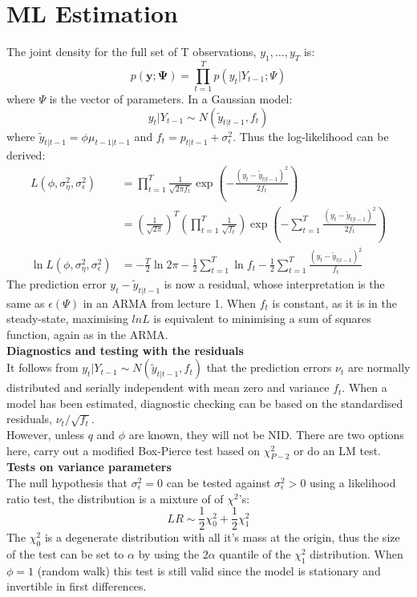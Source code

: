 \documentclass[DIV=14,titlepage=false]{scrreprt}
\begin{document}
\section{ML Estimation}
The joint density for the full set of T observations, $y_1, \dots, y_T$ is:
\[
    p(\mathbf{y;\Psi}) = \prod_{t=1}^T p(y_t|Y_{t-1};\Psi)
\]
where $\Psi$ is the vector of parameters. In a Gaussian model:
\[
    y_t|Y_{t-1} \sim N(\tilde y_{t|t-1}, f_t)
\] where $\tilde y_{t|t-1} = \phi \mu_{t-1|t-1}$ and $f_t = p_{t|t-1} + \sigma^2_\epsilon$. Thus the log-likelihood can be derived:
\begin{align*}
    L(\phi, \sigma^2_\eta, \sigma^2_\epsilon) &= \prod_{t=1}^T \frac{1}{\sqrt{2\pi f_t}} \exp \left( -\frac{(y_t - \tilde y_{t|t-1})^2}{2f_t} \right)\\
    &= \left( \frac{1}{\sqrt{2\pi}} \right)^T \left(\prod_{t=1}^T \frac{1}{\sqrt{f_t}}\right) \exp \left( -\sum_{t=1}^T\frac{(y_t - \tilde y_{t|t-1})^2}{2f_t} \right)\\
    \ln L (\phi, \sigma^2_\eta, \sigma^2_\epsilon) &= -\frac{T}{2} \ln 2\pi - \frac{1}{2} \sum_{t=1}^T \ln f_t - \frac{1}{2} \sum_{t=1}^T \frac{(y_t - \tilde y_{t|t-1})^2}{f_t} 
\end{align*}
The prediction error $y_t - \tilde y_{t|t-1}$ is now a residual, whose interpretation is the same as $\epsilon (\Psi)$ in an ARMA from lecture 1. When $f_t$ is constant, as it is in the steady-state, maximising $ln L$ is equivalent to minimising a sum of squares function, again as in the ARMA.\\
\textbf{Diagnostics and testing with the residuals}\\
It follows from $y_t|Y_{t-1} \sim N(\tilde y_{t|t-1}, f_t)$ that the prediction errors $\nu_t$ are normally distributed and serially independent with mean zero and variance $f_t$. When a model has been estimated, diagnostic checking can be based on the standardised residuals, $\nu_t / \sqrt{f_t}$.\\
However, unless $q$ and $\phi$ are known, they will not be NID. There are two options here, carry out a modified Box-Pierce test based on $\chi^2_{P-2}$ or do an LM test.\\
\textbf{Tests on variance parameters}\\
The null hypothesis that $\sigma^2_\epsilon=0$ can be tested against $\sigma^2_\epsilon>0$ using a likelihood ratio test, the distribution is a mixture of of $\chi^2$'s:
\[
    LR \sim \frac{1}{2} \chi^2_0 + \frac{1}{2} \chi^2_1
\]
The $\chi^2_0$ is a degenerate distribution with all it's mass at the origin, thus the size of the test can be set to $\alpha$ by using the $2 \alpha$ quantile of the $\chi^2_1$ distribution. When $\phi = 1$ (random walk) this test is still valid since the model is stationary and invertible in first differences. \\\\
\end{document}
